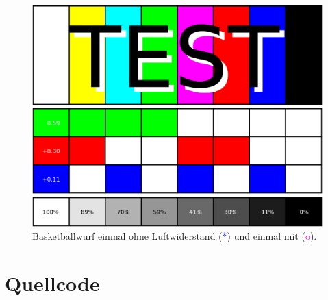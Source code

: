 \documentclass{article}
\newcommand{\matlab}[1]{%
\begin{small}
%
\end{small}
}
\begin{document}
\begin{figure}[h]
	\centering
	\includegraphics[width=\textwidth]{figures/placeholder.png}
	\caption{Basketballwurf einmal ohne Luftwiderstand (\textcolor{blue}{*}) und einmal mit (\textcolor{magenta}{o}).}
\end{figure}



\newpage
\section*{Quellcode}
\matlab{../src/sysDiffGlgen.m}
\matlab{../src/explEulSchwarm.m}
\matlab{../src/heunSchwarm.m}
\end{document}
